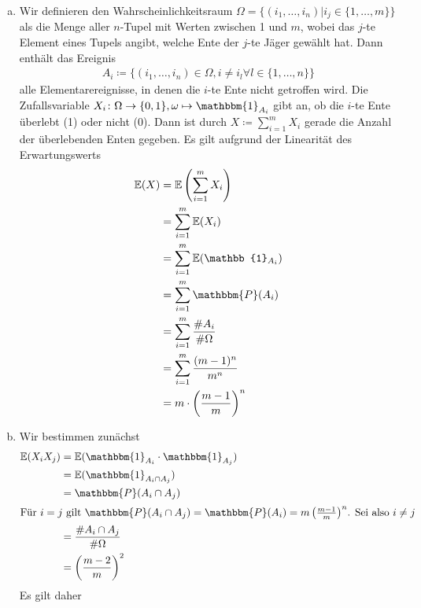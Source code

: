 \documentclass[uebung]{lecture}
\newcommand{\E}{\mathbb{E}}
\renewcommand{\P}{\mathbbm{P}}
\begin{document}
\begin{aufgabe}
    \begin{enumerate}[(a)]
        \item Wir definieren den Wahrscheinlichkeitsraum $\Omega = \{(i_1, \dots, i_n)|i_j \in \{1,\dots, m\}\}$ als die Menge aller $n$-Tupel mit Werten zwischen 1 und $m$, wobei das $j$-te Element eines Tupels angibt, welche Ente der $j$-te Jäger gewählt hat. Dann enthält das Ereignis 
        \begin{align*}
            A_i \coloneqq \{(i_1, \dots, i_n)\in \Omega, i\neq i_l \forall l \in \{1,\dots, n\}\}
        \end{align*}
        alle Elementarereignisse, in denen die $i$-te Ente nicht getroffen wird.
        Die Zufallsvariable $X_i \colon \Omega \to \{0,1\}, \omega \mapsto \mathbbm{1}_{A_i}$ gibt an, ob die $i$-te Ente überlebt (1) oder nicht (0). Dann ist durch $X \coloneqq \sum_{i = 1}^{m} X_i$ gerade die Anzahl der überlebenden Enten gegeben.
        Es gilt aufgrund der Linearität des Erwartungswerts
        \begin{align*}
            \E(X) &= \E\left(\sum_{i = 1}^{m} X_i\right)\\
            &= \sum_{i = 1}^{m} \E(X_i)\\
            &= \sum_{i = 1}^{m} \E(\mathbb{1}_{A_i})\\
            &= \sum_{i = 1}^{m} \P(A_i)\\
            &= \sum_{i = 1}^{m} \frac{\# A_i}{\# \Omega}\\
            &= \sum_{i = 1}^{m} \frac{(m-1)^n}{m^n}\\
            &= m \cdot \left(\frac{m-1}{m}\right)^n
        \end{align*}
        \item Wir bestimmen zunächst
        \begin{align*}
            \E(X_iX_j) &= \E(\mathbbm{1}_{A_i} \cdot \mathbbm{1}_{A_j})\\
            &= \E(\mathbbm{1}_{A_i \cap A_j})\\
            &= \P(A_i \cap A_j)\\
            \intertext{Für $i = j$ gilt $\P(A_i \cap A_j) = \P(A_i) = m\left(\frac{m-1}{m}\right)^n$. Sei also $i\neq j$}
            &= \frac{\# A_i \cap A_j}{\# \Omega}\\
            &= \left(\frac{m-2}{m}\right)^2
        \end{align*}
        Es gilt daher
        \begin{align*}

\end{align*}
\end{enumerate}
\end{aufgabe}
\end{document}
